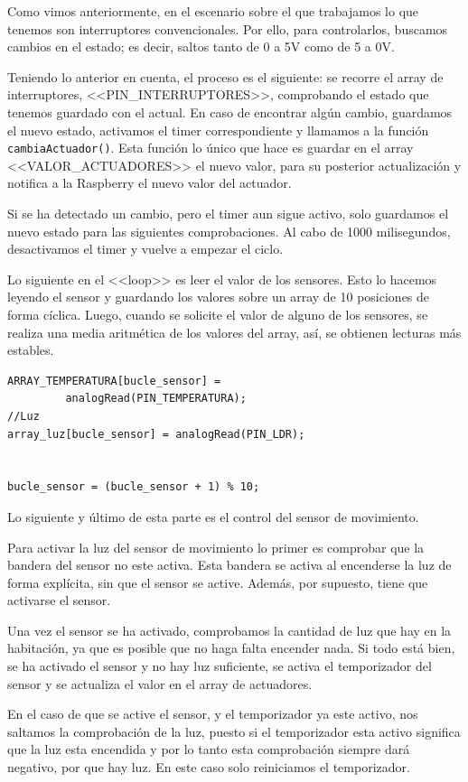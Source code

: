 Como vimos anteriormente, en el escenario sobre el que trabajamos lo que tenemos son interruptores convencionales. Por ello, para controlarlos, buscamos cambios en el estado; es decir, saltos tanto de 0 a 5V como de 5 a 0V. 

Teniendo lo anterior en cuenta, el proceso es el siguiente: se recorre el array de interruptores, <<PIN\_INTERRUPTORES>>, comprobando el estado que tenemos guardado con el actual. En caso de encontrar algún cambio, guardamos el nuevo estado, activamos el timer correspondiente y llamamos a la función \lstinline|cambiaActuador()|. Esta función lo único que hace es guardar en el array <<VALOR\_ACTUADORES>> el nuevo valor, para su posterior actualización y notifica a la Raspberry el nuevo valor del actuador.


Si se ha detectado un cambio, pero el timer aun sigue activo, solo guardamos el nuevo estado para las siguientes comprobaciones. Al cabo de 1000 milisegundos, desactivamos el timer y vuelve a empezar el ciclo.

Lo siguiente en el <<loop>> es leer el valor de los sensores. Esto lo hacemos leyendo el sensor y guardando los valores sobre un array de 10 posiciones de forma cíclica. Luego, cuando se solicite el valor de alguno de los sensores, se realiza una media aritmética de los valores del array, así, se obtienen lecturas más estables.

\begin{lstlisting}
ARRAY_TEMPERATURA[bucle_sensor] = 
         analogRead(PIN_TEMPERATURA);
//Luz
array_luz[bucle_sensor] = analogRead(PIN_LDR);


bucle_sensor = (bucle_sensor + 1) % 10;
\end{lstlisting}


Lo siguiente y último de esta parte es el control del sensor de movimiento. 

Para activar la luz del sensor de movimiento lo primer es comprobar que la bandera del sensor no este activa. Esta bandera se activa al encenderse la luz de forma explícita, sin que el sensor se active. Además, por supuesto, tiene que activarse el sensor.

Una vez el sensor se ha activado, comprobamos la cantidad de luz que hay en la habitación, ya que es posible que no haga falta encender nada. Si todo está bien, se ha activado el sensor y no hay luz suficiente, se activa el temporizador del sensor y se actualiza el valor en el array de actuadores.

En el caso de que se active el sensor, y el temporizador ya este activo, nos saltamos la comprobación de la luz, puesto si el temporizador esta activo significa que la luz esta encendida y por lo tanto esta comprobación siempre dará negativo, por que hay luz. En este caso solo reiniciamos el temporizador.

